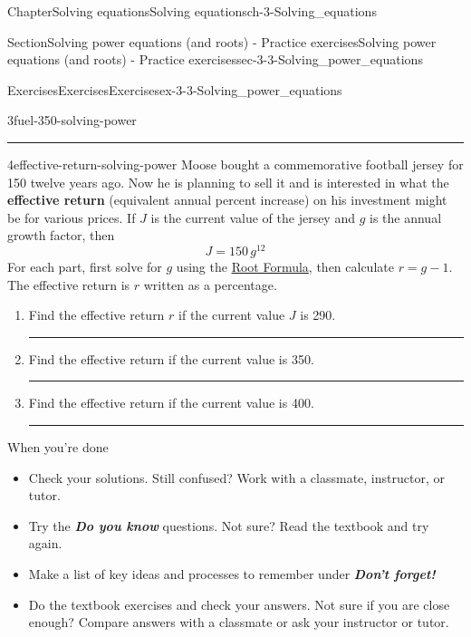 \documentclass[twoside,11pt,]{book}
\newcommand{\alert}[1]{\textbf{\textit{#1}}}
\newcommand{\terminology}[1]{\textbf{#1}}
\newlength{\workspacestrutwidth}
\numberwithin{equation}{section}
\begin{document}
\begin{chapterptx}{Chapter}{Solving equations}{}{Solving equations}{}{}{ch-3-Solving_equations}
\begin{sectionptx}{Section}{Solving power equations (and roots) - Practice exercises}{}{Solving power equations (and roots) - Practice exercises}{}{}{sec-3-3-Solving_power_equations}
\begin{exercises-subsection-numberless}{Exercises}{Exercises}{}{Exercises}{}{}{ex-3-3-Solving_power_equations}
\begin{divisionexercise}{3}{}{}{fuel-350-solving-power}
\begin{enumerate}[label=(\alph*),ref=\alph*]
\par\rule{\workspacestrutwidth}{2.5in}%
\end{enumerate}%
\end{divisionexercise}%
\clearpage
\begin{divisionexercise}{4}{}{}{effective-return-solving-power}%
Moose bought a commemorative football jersey for \textdollar{}150 twelve years ago. Now he is planning to sell it and is interested in what the \terminology{effective return} (equivalent annual percent increase) on his investment might be for various prices. If \textdollar{}\(J\) is the current value of the jersey and \(g\) is the annual growth factor, then%
\begin{equation*}
J=150\, g^{12}
\end{equation*}
For each part, first solve for \(g\) using the \hyperref[root-formula]{Root Formula}, then calculate \(r=g-1\). The effective return is \(r\) written as a percentage.%
\begin{enumerate}[label=(\alph*),ref=\alph*]%
\item{}Find the effective return \(r\) if the current value \(J\) is \textdollar{}290.%
\par\rule{\workspacestrutwidth}{2in}%
\item{}Find the effective return if the current value is \textdollar{}350.%
\par\rule{\workspacestrutwidth}{2in}%
\item{}Find the effective return if the current value is \textdollar{}400.%
\par\rule{\workspacestrutwidth}{1.75in}%
\end{enumerate}%
\end{divisionexercise}%
\end{exercises-subsection-numberless}
\begin{conclusion}{When you're done \textellipsis{}}%
%
\begin{itemize}[label=\textbullet]
\item{}Check your solutions. Still confused? Work with a classmate, instructor, or tutor.%
\item{}Try the \alert{Do you know} questions. Not sure? Read the textbook and try again.%
\item{}Make a list of key ideas and processes to remember under \alert{Don't forget!}%
\item{}Do the textbook exercises and check your answers. Not sure if you are close enough? Compare answers with a classmate or ask your instructor or tutor.%

\end{itemize}
\end{conclusion}
\end{sectionptx}
\end{chapterptx}
\end{document}
